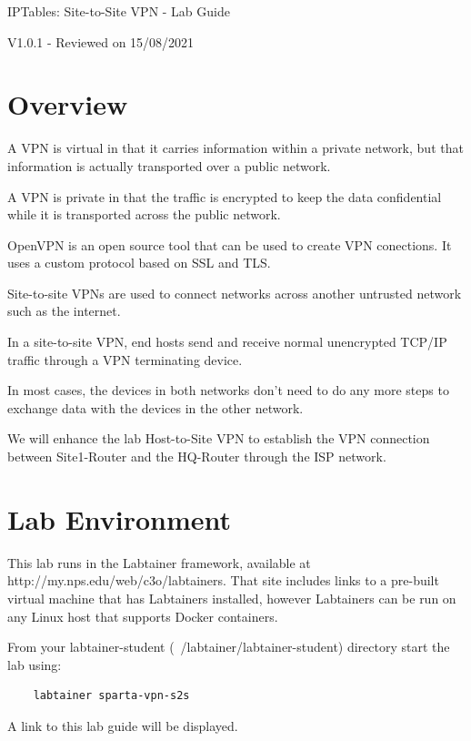 


\begin{center}
{\LARGE IPTables: Site-to-Site VPN - Lab Guide}

V1.0.1 - Reviewed on 15/08/2021
\vspace{0.1in}\\
\end{center}

\copyrightnotice

\section{Overview}
A VPN is virtual in that it carries information within a private network, but that information is actually transported over a public network.

A VPN is private in that the traffic is encrypted to keep the data confidential while it is transported across the public network.

OpenVPN is an open source tool that can be used to create VPN conections. It uses a custom protocol based on SSL and TLS.

Site-to-site VPNs are used to connect networks across another untrusted network such as the internet.

In a site-to-site VPN, end hosts send and receive normal unencrypted TCP/IP traffic through a VPN terminating device.

In most cases, the devices in both networks don't need to do any more steps to exchange data with the devices in the other network.

We will enhance the lab Host-to-Site VPN to establish the VPN connection between Site1-Router and the HQ-Router through the ISP network.

\section{Lab Environment}
This lab runs in the Labtainer framework,
available at http://my.nps.edu/web/c3o/labtainers.
That site includes links to a pre-built virtual machine
that has Labtainers installed, however Labtainers can
be run on any Linux host that supports Docker containers.

From your labtainer-student (~/labtainer/labtainer-student) directory start the lab using:
\begin{verbatim}
    labtainer sparta-vpn-s2s
\end{verbatim}
\noindent A link to this lab guide will be displayed.


